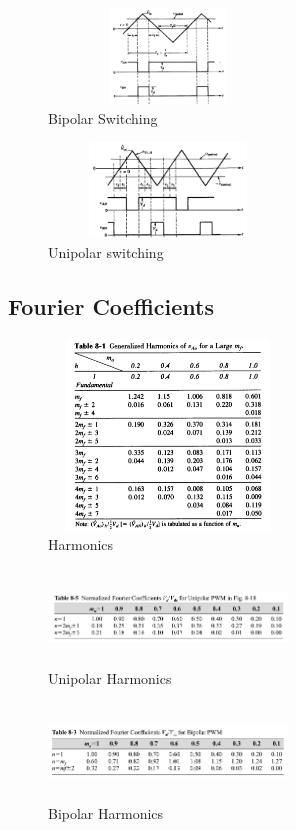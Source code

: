 \documentclass[twocolumn, ]{article}
\begin{document}
\begin{figure}[!ht]
	\includegraphics[width=2.5in,height=1in]{bipolar1.png}
	\caption{Bipolar Switching}
\end{figure}
\begin{figure}[!ht]
	\includegraphics[width=2.5in,height=1in]{unipolar1.png}
	\caption{Unipolar switching}
\end{figure}

\subsection*{Fourier Coefficients}
\begin{figure}[!ht]
	\includegraphics[width=2.5in,height=2in]{pwm_harmonics_table.png}
	\caption{Harmonics}
\end{figure}
\begin{figure}[!ht]
	\includegraphics[width=2.5in,height=1in]{unipolar_harmonics2.png}
	\caption{Unipolar Harmonics}
\end{figure}
\begin{figure}[!ht]
	\includegraphics[width=2.5in,height=1in]{bipolar_harmonics2.png}
	\caption{Bipolar Harmonics}
\end{figure}
\end{document}
